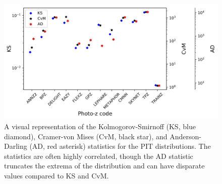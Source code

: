 \begin{figure}
\centering
\includegraphics[width=\textwidth]{fig/KSvsCvMvsAD_PIT_withnull_jpg.jpg}
\caption{A visual representation of the Kolmogorov-Smirnoff (KS, blue diamond), Cramer-von Mises (CvM, black star), and Anderson-Darling (AD, red asterisk) statistics for the PIT distributions.  The statistics are often highly correlated, though the AD statistic truncates the extrema of the distribution and can have disparate values compared to KS and CvM.} \label{fig:pit_stats}
\end{figure}

